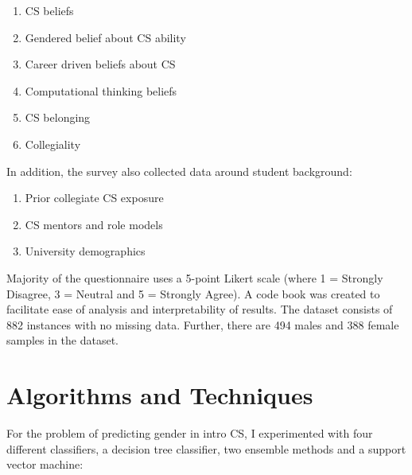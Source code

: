 \begin{enumerate}%
\item CS beliefs
\item Gendered belief about CS ability
\item Career driven beliefs about CS
\item Computational thinking beliefs
\item CS belonging
\item Collegiality
\end{enumerate}

In addition, the survey also collected data around student background: 

\begin{enumerate}%
\item Prior collegiate CS exposure
\item CS mentors and role models
\item University demographics
\end{enumerate}



Majority of the questionnaire uses a 5-point Likert scale (where 1 = Strongly Disagree, 3 = Neutral and 5 = Strongly Agree). A code book was created to facilitate ease of analysis and interpretability of results. The dataset consists of 882 instances with no missing data. Further, there are 494 males and 388 female samples in the dataset. 


\section*{Algorithms and Techniques}

For the problem of predicting gender in intro CS, I experimented with four different classifiers, a decision tree classifier, two ensemble methods and a support vector machine:

